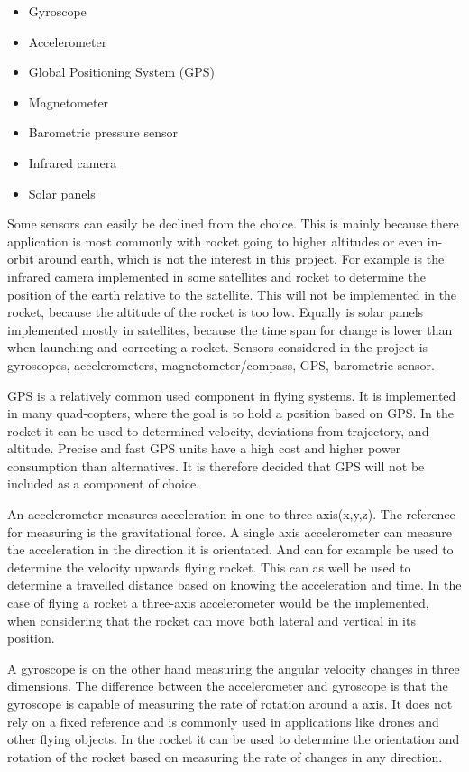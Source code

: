 \begin{itemize}[noitemsep]
\item Gyroscope
\item Accelerometer
\item Global Positioning System (GPS)
\item Magnetometer
\item Barometric pressure sensor
\item Infrared camera
\item Solar panels
\end{itemize}

Some sensors can easily be declined from the choice. This is mainly because there application is most commonly with rocket going to higher altitudes or even in-orbit around earth, which is not the interest in this project. For example is the infrared camera implemented in some satellites and rocket to determine the position of the earth relative to the satellite. This will not be implemented in the rocket, because the altitude of the rocket is too low. Equally is solar panels implemented mostly in satellites, because the time span for change is lower than when launching and correcting a rocket.
Sensors considered in the project is gyroscopes, accelerometers, magnetometer/compass, GPS, barometric sensor. 

GPS is a relatively common used component in flying systems. It is implemented in many quad-copters, where the goal is to hold a position based on GPS. In the rocket it can be used to determined velocity, deviations from trajectory, and altitude. Precise and fast GPS units have a high cost and higher power consumption than alternatives. It is therefore decided that GPS will not be included as a component of choice.    

An accelerometer measures acceleration in one to three axis(x,y,z). The reference for measuring is the gravitational force. A single axis accelerometer can measure the acceleration in the direction it is orientated. And can for example be used to determine the velocity upwards flying rocket. This can as well be used to determine a travelled distance based on knowing the acceleration and time. In the case of flying a rocket a three-axis accelerometer would be the implemented, when considering that the rocket can move both lateral and vertical in its position.  


A gyroscope is on the other hand measuring the angular velocity changes in three dimensions. The difference between the accelerometer and gyroscope is that the gyroscope is capable of measuring the rate of rotation around a axis. It does not rely on a fixed reference and is commonly used in applications like drones and other flying objects. In the rocket it can be used to determine the orientation and rotation of the rocket based on measuring the rate of changes in any direction.  


